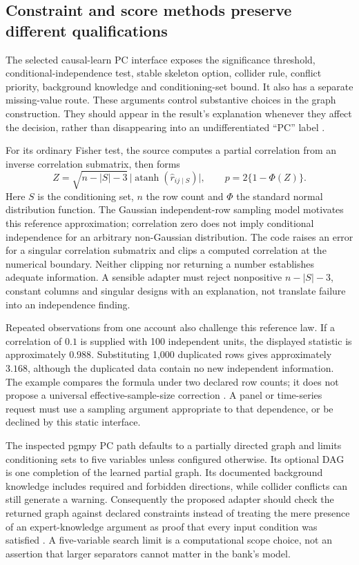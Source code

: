 \subsection{Constraint and score methods preserve different qualifications}

The selected causal-learn PC interface exposes the significance threshold,
conditional-independence test, stable skeleton option, collider rule, conflict
priority, background knowledge and conditioning-set bound. It also has a
separate missing-value route. These arguments control substantive choices in
the graph construction. They should appear in the result's explanation whenever
they affect the decision, rather than disappearing into an undifferentiated
``PC'' label \citep{exec13_pydisc_causallearn}.

For its ordinary Fisher test, the source computes a partial correlation from
an inverse correlation submatrix, then forms
\begin{equation}
 Z=\sqrt{n-|S|-3}\,\bigl|\operatorname{atanh}(\widehat r_{ij\mid S})\bigr|,
 \qquad p=2\{1-\Phi(Z)\}.
\end{equation}
Here \(S\) is the conditioning set, \(n\) the row count and \(\Phi\) the
standard normal distribution function. The Gaussian independent-row sampling
model motivates this reference approximation; correlation zero does not imply
conditional independence for an arbitrary non-Gaussian distribution. The code
raises an error for a singular correlation submatrix and clips a computed
correlation at the numerical boundary. Neither clipping nor returning a
number establishes adequate information. A sensible adapter must reject
nonpositive \(n-|S|-3\), constant columns and singular designs with an
explanation, not translate failure into an independence finding.

Repeated observations from one account also challenge this reference law. If a
correlation of \(0.1\) is supplied with 100 independent units, the displayed
statistic is approximately \(0.988\). Substituting 1,000 duplicated rows gives
approximately \(3.168\), although the duplicated data contain no new
independent information. The example compares the formula under two declared
row counts; it does not propose a universal effective-sample-size correction
\citep{exec13_pydisc_examples}. A panel or time-series request must use a
sampling argument appropriate to that dependence, or be declined by this
static interface.

The inspected pgmpy PC path defaults to a partially directed graph and limits
conditioning sets to five variables unless configured otherwise. Its optional
DAG is one completion of the learned partial graph. Its documented background
knowledge includes required and forbidden directions, while collider conflicts
can still generate a warning. Consequently the proposed adapter should check
the returned graph against declared constraints instead of treating the mere
presence of an expert-knowledge argument as proof that every input condition
was satisfied \citep{exec13_pydisc_pgmpy}. A five-variable search limit is a
computational scope choice, not an assertion that larger separators cannot
matter in the bank's model.

